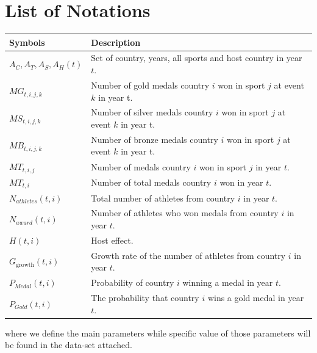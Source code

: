 \documentclass{mcmthesis}
\begin{document}
	\section{List of Notations}
	\begin{center}
		\begin{tabular}{ll}
			\toprule
			{\bf Symbols} & {\bf Description}  \\
			\midrule 
			$A_{C},A_{T},A_{S},A_{H}(t)$ & Set of country, years, all sports and host country in year $t$.\\
			$MG_{t,i,j,k}$ & Number of gold medals country $i$ won in sport $j$ at event $k$ in year t. \\
			$MS_{t,i,j,k}$ & Number of silver medals country $i$ won in sport $j$ at event $k$ in year t. \\
			$MB_{t,i,j,k}$ & Number of bronze medals country $i$ won in sport $j$ at event $k$ in year t. \\
			$MT_{t,i,j}$ & Number of medals country $i$ won in sport $j$ in year $t$. \\
			$MT_{t,i}$ & Number of total medals country $i$ won in year $t$. \\
			$N_{athletes}(t,i)$ & Total number of athletes from country $i$ in year $t$. \\
			$N_{award}(t,i)$ & Number of athletes who won medals from country $i$ in year $t$. \\
			$H(t,i)$ & Host effect. \\
			$G_{\text{growth}}(t,i)$ & Growth rate of the number of athletes from country $i$ in year $t$.\\
			$P_{Medal}(t,i)$ & Probability of country $i$ winning a medal in year $t$.\\
			$P_{Gold}(t,i)$ & The probability that country $i$ wins a gold medal in year $t$.\\
			\bottomrule
		\end{tabular}
	\end{center}
	
	\noindent where we define the main parameters while specific value of those 
	parameters will be found in the data-set attached.
	
	
	
	
	
	
	
	
	
	
	
\end{document}
